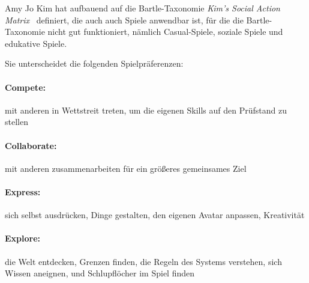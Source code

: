 Amy Jo Kim hat aufbauend auf die Bartle-Taxonomie \emph{Kim’s Social Action Matrix}~\cite{kims-social-action-matrix} definiert, die auch auch Spiele anwendbar ist, für die die Bartle-Taxonomie nicht gut funktioniert, nämlich Casual-Spiele, soziale Spiele und edukative Spiele.

Sie unterscheidet die folgenden Spielpräferenzen:

\paragraph{Compete:} mit anderen in Wettstreit treten, um die eigenen Skills auf den Prüfstand zu stellen
\paragraph{Collaborate:} mit anderen zusammenarbeiten für ein größeres gemeinsames Ziel
\paragraph{Express:} sich selbst ausdrücken, Dinge gestalten, den eigenen Avatar anpassen, Kreativität
\paragraph{Explore:} die Welt entdecken, Grenzen finden, die Regeln des Systems verstehen, sich Wissen aneignen, und Schlupflöcher im Spiel finden
